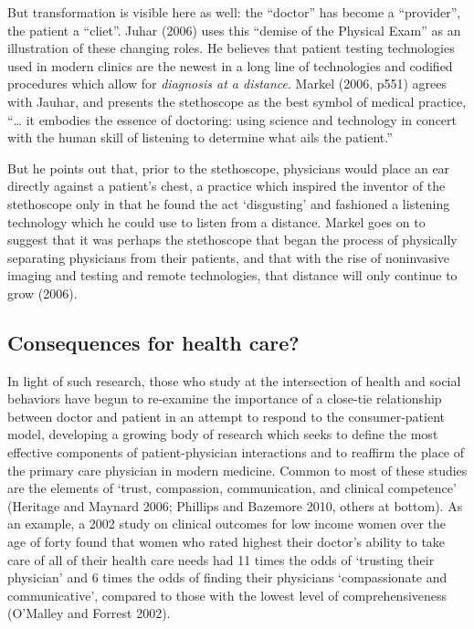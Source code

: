 \documentclass[12pt,twoside]{reedthesis}
\begin{document}
  But transformation is visible here as well: the ``doctor'' has become a
  ``provider'', the patient a ``cliet''. Juhar (2006) uses this ``demise
  of the Physical Exam'' as an illustration of these changing roles. He
  believes that patient testing technologies used in modern clinics are
  the newest in a long line of technologies and codified procedures which
  allow for \emph{diagnosis at a distance}. Markel (2006, p551) agrees
  with Jauhar, and presents the stethoscope as the best symbol of medical
  practice, ``\ldots{} it embodies the essence of doctoring: using science
  and technology in concert with the human skill of listening to determine
  what ails the patient.''
  
  But he points out that, prior to the stethoscope, physicians would place
  an ear directly against a patient's chest, a practice which inspired the
  inventor of the stethoscope only in that he found the act `disgusting'
  and fashioned a listening technology which he could use to listen from a
  distance. Markel goes on to suggest that it was perhaps the stethoscope
  that began the process of physically separating physicians from their
  patients, and that with the rise of noninvasive imaging and testing and
  remote technologies, that distance will only continue to grow (2006).
  
  \subsection*{Consequences for health
  care?}\label{consequences-for-health-care}
  
  In light of such research, those who study at the intersection of health
  and social behaviors have begun to re-examine the importance of a
  close-tie relationship between doctor and patient in an attempt to
  respond to the consumer-patient model, developing a growing body of
  research which seeks to define the most effective components of
  patient-physician interactions and to reaffirm the place of the primary
  care physician in modern medicine. Common to most of these studies are
  the elements of `trust, compassion, communication, and clinical
  competence' (Heritage and Maynard 2006; Phillips and Bazemore 2010,
  others at bottom). As an example, a 2002 study on clinical outcomes for
  low income women over the age of forty found that women who rated
  highest their doctor's ability to take care of all of their health care
  needs had 11 times the odds of `trusting their physician' and 6 times
  the odds of finding their physicians `compassionate and communicative',
  compared to those with the lowest level of comprehensiveness (O'Malley
  and Forrest 2002).
  
\end{document}
